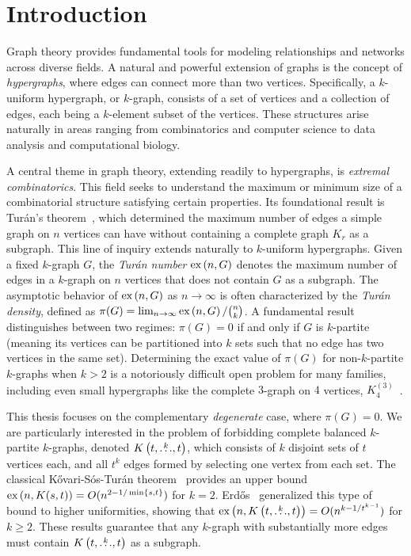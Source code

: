 \section{Introduction}\label{sec:introduction}

Graph theory provides fundamental tools for modeling relationships and networks across diverse fields.
A natural and powerful extension of graphs is the concept of \emph{hypergraphs}, where edges can connect more than two vertices.
Specifically, a $k$-uniform hypergraph, or $k$-graph, consists of a set of vertices and a collection of edges, each being a $k$-element subset of the vertices.
These structures arise naturally in areas ranging from combinatorics and computer science to data analysis and computational biology.

A central theme in graph theory, extending readily to hypergraphs, is \emph{extremal combinatorics}.
This field seeks to understand the maximum or minimum size of a combinatorial structure satisfying certain properties.
Its foundational result is Turán's theorem~\cite{Turan1941},
which determined the maximum number of edges a simple graph on $n$
vertices can have without containing a complete graph $K_r$ as a subgraph.
This line of inquiry extends naturally to $k$-uniform hypergraphs.
Given a fixed $k$-graph $G$, the \emph{Turán number} $\text{ex} \left( n, G \right)$ denotes the maximum number of edges in a $k$-graph on $n$ vertices that does not contain $G$ as a subgraph.
The asymptotic behavior of $\text{ex} \left( n, G \right)$ as $n \to \infty$
is often characterized by the \emph{Turán density}, defined as $\pi(G) = \lim_{n \to \infty} \text{ex} \left( n, G \right) / \binom{n}{k}$.
A fundamental result distinguishes between two regimes: $\pi(G) = 0$ if and only if $G$ is $k$-partite
(meaning its vertices can be partitioned into $k$ sets such that no edge has two vertices in the same set).
Determining the exact value of $\pi(G)$ for non-$k$-partite $k$-graphs when $k > 2$
is a notoriously difficult open problem for many families, including even small hypergraphs like the complete $3$-graph on $4$ vertices,
$K_4^{(3)}$~\cite{keevash2011hypergraph, razborov20103}.

This thesis focuses on the complementary \emph{degenerate} case, where $\pi(G) = 0$.
We are particularly interested in the problem of forbidding complete balanced $k$-partite $k$-graphs,
denoted $K\left(t, \overset{k}{\dots}, t\right)$, which consists of $k$ disjoint sets of $t$ vertices each,
and all $t^k$ edges formed by selecting one vertex from each set.
The classical Kővari-Sós-Turán theorem~\cite{Kovari1954, Hylten1958} provides an upper bound $\text{ex} \left( n, K(s, t) \right) = O(n^{2 - 1/\min\{s,t\}})$ for $k=2$.
Erdős~\cite{Erods1964} generalized this type of bound to higher uniformities, showing that $\text{ex} \left( n, K\left(t, \overset{k}{\dots}, t\right) \right) = O(n^{k - 1/t^{k-1}})$ for $k \ge 2$.
These results guarantee that any $k$-graph with substantially more edges must contain $K\left(t, \overset{k}{\dots}, t\right)$ as a subgraph.


